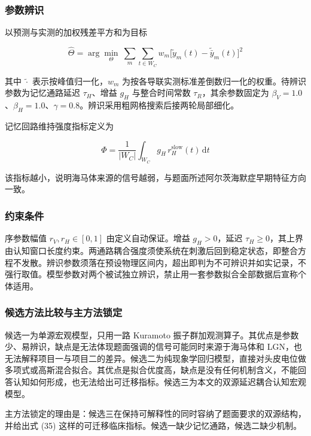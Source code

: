 \documentclass[bwprint]{gmcmthesis}
\begin{document}
\subsubsection{参数辨识}

以预测与实测的加权残差平方和为目标

\begin{equation}
\hat\Theta = \arg\min_{\Theta}\ \sum_{m}\sum_{t \in W_C} w_m\bigl[\tilde y_m(t) - \tilde{\bar y}_m(t)\bigr]^{2}
\end{equation}

其中 $\tilde{\cdot}$ 表示按峰值归一化，$w_m$ 为按各导联实测标准差倒数归一化的权重。待辨识参数为记忆通路延迟 $\tau_H$、增益 $g_H$ 与整合时间常数 $\tau_R$，其余参数固定为 $\beta_V = 1.0$、$\beta_H = 1.0$、$\gamma = 0.8$。辨识采用粗网格搜索后接两轮局部细化。

记忆回路维持强度指标定义为

\begin{equation}
\Phi = \frac{1}{|W_C|}\int_{W_C} g_H\, r_H^{\mathrm{slow}}(t)\,\mathrm{d}t
\end{equation}

该指标越小，说明海马体来源的信号越弱，与题面所述阿尔茨海默症早期特征方向一致。

\subsubsection{约束条件}

序参数幅值 $r_V, r_H \in [0,1]$ 由定义自动保证。增益 $g_H > 0$，延迟 $\tau_H \ge 0$，其上界由认知窗口长度约束。两通路耦合强度须使系统在刺激后回到稳定状态，即整合方程不发散。辨识参数须落在预设物理区间内，超出即判为不可辨识并如实记录，不强行取值。模型参数对两个被试独立辨识，禁止用一套参数拟合全部数据后宣称个体适用。

\subsubsection{候选方法比较与主方法锁定}

候选一为单源宏观模型，只用一路 Kuramoto 振子群加观测算子。其优点是参数少、易辨识，缺点是无法体现题面强调的信号可能同时来源于海马体和 LGN，也无法解释项目一与项目二的差异。候选二为纯现象学回归模型，直接对头皮电位做多项式或高斯混合拟合。其优点是拟合优度高，缺点是没有任何机制含义，不能回答认知如何形成，也无法给出可迁移指标。候选三为本文的双源延迟耦合认知宏观模型。

主方法锁定的理由是：候选三在保持可解释性的同时容纳了题面要求的双源结构，并给出式 (35) 这样的可迁移临床指标。候选一缺少记忆通路，候选二缺少机制。
\end{document}
